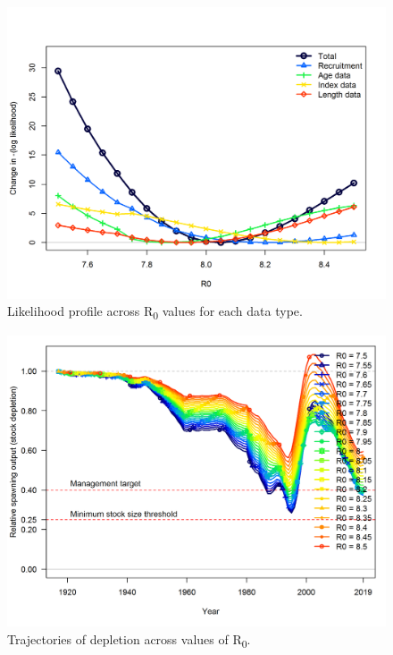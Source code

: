 \documentclass[12pt,]{article}
\begin{document}
\begin{figure}
\centering
\includegraphics{Figures/profile_R0_like.png}
\caption{Likelihood profile across R\textsubscript{0} values for each
data type. \label{fig:profile_R0_like}}
\end{figure}

\begin{figure}
\centering
\includegraphics{Figures/profile_R0_depl.png}
\caption{Trajectories of depletion across values of R\textsubscript{0}.
\label{fig:profile_R0_depl}}
\end{figure}

\FloatBarrier
\end{document}
